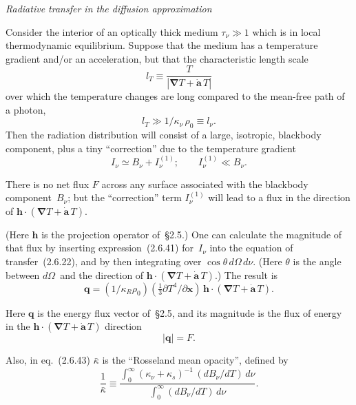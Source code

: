 \bigskip
\noindent
\emph{Radiative transfer in the diffusion approximation}

\medskip
\noindent
Consider the interior of an optically thick medium $\tau_\nu \gg 1$ which is
in local thermodynamic equilibrium.  Suppose that the medium has a temperature
gradient and/or an acceleration, but that the characteristic length scale
%
\begin{equation}
\tag{2.6.39}
l_T \equiv \frac{T}{|\boldsymbol{\nabla}T + \dot{\mathbf{a}}\,T|}
\end{equation}
%
over which the temperature changes are long compared to the mean-free path of a
photon,
%
\begin{equation}
\tag{2.6.40}
l_T \gg 1/\kappa_\nu\,\rho_0 \equiv l_\nu.
\end{equation}
%
Then the radiation distribution will consist of a large, isotropic, blackbody
component, plus a tiny ``correction'' due to the temperature gradient
%
\begin{equation}
\tag{2.6.41}
I_\nu \simeq B_\nu + I_\nu^{(1)};\qquad
I_\nu^{(1)} \ll B_\nu.
\end{equation}

There is no net flux $F$ across any surface associated with the blackbody
component~$B_\nu$; but the ``correction'' term $I_\nu^{(1)}$ will lead to a
flux in the direction of
$\mathbf{h}\cdot(\boldsymbol{\nabla}T+\dot{\mathbf{a}}\,T)$.

(Here $\mathbf{h}$ is the projection operator of~\S2.5.)  One can calculate
the magnitude of that flux by inserting expression~(2.6.41) for~$I_\nu$ into
the equation of transfer~(2.6.22), and by then integrating over
$\cos\theta\,d\Omega\,d\nu$.  (Here $\theta$ is the angle between
$d\Omega$~and the direction of
$\mathbf{h}\cdot(\boldsymbol{\nabla}T+\dot{\mathbf{a}}\,T)$.)
The result is
%
\begin{equation}
\tag{2.6.43}
\mathbf{q} = (1/\kappa_R\rho_0)(\tfrac{1}{3}\partial T^4/\partial \mathbf{x})
  \,\mathbf{h}\cdot(\boldsymbol{\nabla}T + \dot{\mathbf{a}}\,T).
\end{equation}

Here $\mathbf{q}$ is the energy flux vector of~\S2.5, and its magnitude is the
flux of energy in the
$\mathbf{h}\cdot(\boldsymbol{\nabla}T+\dot{\mathbf{a}}\,T)$ direction
%
\begin{equation}
\tag{2.6.44}
|\mathbf{q}| = F.
\end{equation}

Also, in eq.~(2.6.43) $\bar{\kappa}$ is the ``Rosseland mean opacity'',
defined by
%
\begin{equation}
\tag{2.6.45}
\frac{1}{\bar{\kappa}}
\equiv \frac{\displaystyle\int_0^\infty
  (\kappa_\nu + \kappa_s)^{-1}\,
  (dB_\nu/dT)\,d\nu}
  {\displaystyle\int_0^\infty (dB_\nu/dT)\,d\nu}.
\end{equation}

